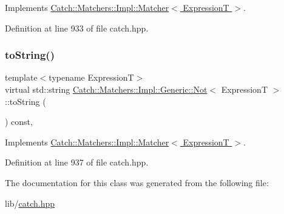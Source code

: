 Implements \hyperlink{struct_catch_1_1_matchers_1_1_impl_1_1_matcher_a8c1c5511ce1f3738a45e6901b558f583}{Catch\+::\+Matchers\+::\+Impl\+::\+Matcher$<$ Expression\+T $>$}.



Definition at line 933 of file catch.\+hpp.

\hypertarget{class_catch_1_1_matchers_1_1_impl_1_1_generic_1_1_not_ab970a4a6e58a987451e0b0e0e60a0bff}{}\label{class_catch_1_1_matchers_1_1_impl_1_1_generic_1_1_not_ab970a4a6e58a987451e0b0e0e60a0bff} 
\subsubsection{\texorpdfstring{to\+String()}{toString()}}
{\footnotesize\ttfamily template$<$typename ExpressionT$>$ \\
virtual std\+::string \hyperlink{class_catch_1_1_matchers_1_1_impl_1_1_generic_1_1_not}{Catch\+::\+Matchers\+::\+Impl\+::\+Generic\+::\+Not}$<$ ExpressionT $>$\+::to\+String (\begin{DoxyParamCaption}{ }\end{DoxyParamCaption}) const\hspace{0.3cm}{\ttfamily [inline]}, {\ttfamily [virtual]}}



Implements \hyperlink{struct_catch_1_1_matchers_1_1_impl_1_1_matcher_a091bcc37e589967d7e10fc7790d820e2}{Catch\+::\+Matchers\+::\+Impl\+::\+Matcher$<$ Expression\+T $>$}.



Definition at line 937 of file catch.\+hpp.



The documentation for this class was generated from the following file\+:\begin{DoxyCompactItemize}
\item 
lib/\hyperlink{catch_8hpp}{catch.\+hpp}\end{DoxyCompactItemize}
